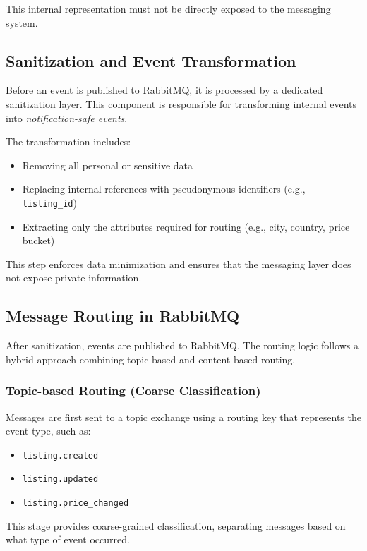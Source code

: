 This internal representation must not be directly exposed to the messaging system.

\subsection{Sanitization and Event Transformation}

Before an event is published to RabbitMQ, it is processed by a dedicated sanitization layer. This component is responsible for transforming internal events into \textit{notification-safe events}.

The transformation includes:
\begin{itemize}
    \item Removing all personal or sensitive data
    \item Replacing internal references with pseudonymous identifiers (e.g., \texttt{listing\_id})
    \item Extracting only the attributes required for routing (e.g., city, country, price bucket)
\end{itemize}

This step enforces data minimization and ensures that the messaging layer does not expose private information.

\subsection{Message Routing in RabbitMQ}

After sanitization, events are published to RabbitMQ. The routing logic follows a hybrid approach combining topic-based and content-based routing.

\subsubsection{Topic-based Routing (Coarse Classification)}

Messages are first sent to a topic exchange using a routing key that represents the event type, such as:

\begin{itemize}
    \item \texttt{listing.created}
    \item \texttt{listing.updated}
    \item \texttt{listing.price\_changed}
\end{itemize}

This stage provides coarse-grained classification, separating messages based on what type of event occurred.

